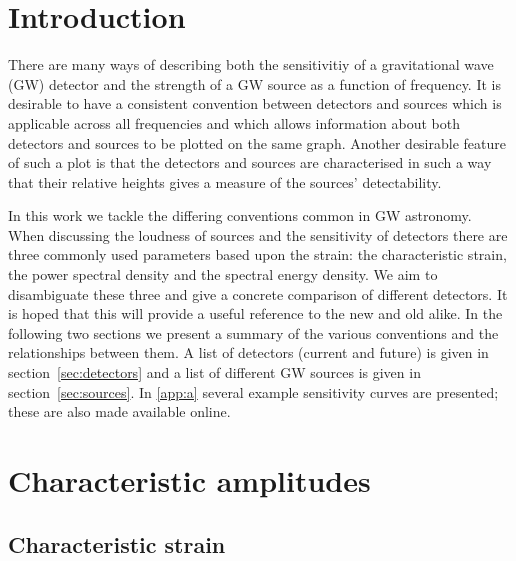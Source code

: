 \section{Introduction}
There are many ways of describing both the sensitivitiy of a gravitational wave (GW) detector and the strength of a GW source as a function of frequency. It is desirable to have a consistent convention between detectors and sources which is applicable across all frequencies and which allows information about both detectors and sources to be plotted on the same graph. Another desirable feature of such a plot is that the detectors and sources are characterised in such a way that their relative heights gives a measure of the sources' detectability. 

In this work we tackle the differing conventions common in GW astronomy. When discussing the loudness of sources and the sensitivity of detectors there are three commonly used parameters based upon the strain: the characteristic strain, the power spectral density and the spectral energy density. We aim to disambiguate these three and give a concrete comparison of different detectors. It is hoped that this will provide a useful reference to the new and old alike. In the following two sections we present a summary of the various conventions and the relationships between them. A list of detectors (current and future) is given in section~\ref{sec:detectors} and a list of different GW sources is given in section~\ref{sec:sources}. In \ref{app:a} several example sensitivity curves are presented; these are also made available online.



\section{Characteristic amplitudes}
\subsection{Characteristic strain}


